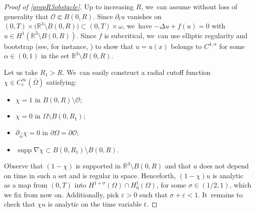 \documentclass[10pt]{amsart}
\DeclareMathOperator{\supp}{\mathrm{supp}}
\theoremstyle{definition}
\let\mc\mathcal
\let\al\alpha
\let\veps\varepsilon
\renewcommand{\O}{\mc{O}}
\newcommand{\R}{\mathbb{R}}
\begin{document}
\begin{proof}[Proof of \cref{propR3obstacle}] Up to increasing $R$, we~can assume without loss of generality that $\O\Subset B(0,R)$. Since $\partial_t u$ vanishes on $(0, T)\times\big(\R^3\setminus B(0,R)\big)\subset (0, T)\times \omega $, we~have $-\Delta u+f(u)=0$ with $u\in H^1(\R^3\setminus B(0, R))$. Since $f$ is subcritical, we~can use elliptic regularity and bootstrap (see, for instance, \cite[Th.\,9.19]{GT01}) to show that $u=u(x)$ belongs to $C^{4, \al}$ for some $\al\in (0, 1)$ in the set $\R^3\setminus B(0, R)$.

Let us take $R_1>R$. We~can easily construct a radial cutoff function $\chi\in C_c^\infty(\overline{\Omega})$ satisfying:
\begin{itemize}
\item $\chi=1$ in $B(0, R)\setminus \O$;
\item $\chi=0$ in $\Omega\setminus B(0, R_1)$;
\item $\partial_{\vec n}\chi=0$ in $\partial\Omega=\partial\O$;
\item $\supp\nabla\chi\subset B(0, R_1)\setminus B(0, R)$.
\end{itemize}
Observe that $(1-\chi)$ is supported in $\R^3\setminus B(0, R)$ and that $u$ does not depend on time in such a set and is regular in space. Henceforth, $(1-\chi) u$ is analytic as a map from $(0, T)$ into $H^{1+\sigma}(\Omega)\cap H_0^1(\Omega)$, for some $\sigma\in (1/2, 1)$, which we fix from now on. Additionally, pick $\veps>0$ such that $\sigma+\veps<1$. It~remains to check that $\chi u$ is analytic on the time variable $t$.


\end{proof}
\end{document}
